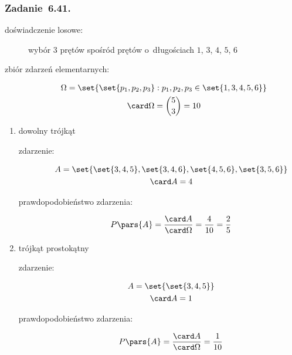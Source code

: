 \subsubsection*{Zadanie~6.41.}
\begin{description}
    \item[doświadczenie losowe:] wybór \(3\) prętów spośród prętów o~długościach \(1\), \(3\), \(4\), \(5\), \(6\)
    \item[zbiór zdarzeń elementarnych:]
        \begin{gather*}
            \Omega = \set{\set{p_1, p_2, p_3} : p_1, p_2, p_3 \in \set{1, 3, 4, 5, 6}}\\
            \card\Omega = \binom{5}{3} = 10
        \end{gather*}
\end{description}
\begin{enumerate}[label={\alph*)}]
    \item dowolny trójkąt
        \begin{description}
            \item[zdarzenie:]
                \begin{gather*}
                    A = \set{\set{3, 4, 5}, \set{3, 4, 6}, \set{4, 5, 6}, \set{3, 5, 6}}\\
                    \card A = 4
                \end{gather*}
            \item[prawdopodobieństwo zdarzenia:]
                \begin{equation*}
                    P\pars{A}
                        = \frac{\card A}{\card\Omega}
                        = \frac{4}{10}
                        = \frac{2}{5}
                \end{equation*}
        \end{description}
    \item trójkąt prostokątny
        \begin{description}
            \item[zdarzenie:]
                \begin{gather*}
                    A = \set{\set{3, 4, 5}}\\
                    \card A = 1
                \end{gather*}
            \item[prawdopodobieństwo zdarzenia:]
                \begin{equation*}
                    P\pars{A}
                        = \frac{\card A}{\card\Omega}
                        = \frac{1}{10}
                \end{equation*}
        \end{description}
\end{enumerate}
